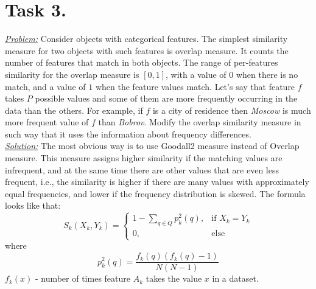 \documentclass[a4paper,12pt]{article} %
\begin{document}
\section*{Task 3.}
\underline{\textit{Problem:}} Consider objects with categorical features. The simplest similarity measure for two objects with such
features is overlap measure. It counts the number of features that match in both objects. The range of per-features similarity for the overlap measure is $[0, 1]$, with a value of $0$ when there is no match, and
a value of $1$ when the feature values match. Let’s say that feature $f$ takes $P$ possible values and some of them are more frequently occurring in the data than the others. For example, if $f$ is a city of residence then \textit{Moscow} is much more frequent value of $f$ than \textit{Bobrov}. Modify the overlap similarity measure in such way that it uses the information about frequency differences.\\
\newline
\underline{\textit{Solution:}} The most obvious way is to use Goodall2 measure instead of Overlap measure. This measure assigns higher similarity if the matching values are infrequent, and at the same time there are other values that are even less frequent, i.e., the similarity is higher if there are many values with approximately equal frequencies, and lower if the frequency distribution is skewed. The formula looks like that:
\[
S_k(X_k, Y_k) = 
\begin{cases} 
1 - \sum\limits_{q \in Q}p_k^2(q), &\mbox{if } X_k = Y_k \\
0, & \mbox{else}
\end{cases} 
\]
where 
\[
	p_k^2(q) = \frac{f_k(q)(f_k(q) - 1)}{N(N - 1)}
\]
$f_k(x)$ - number of times feature $A_k$ takes the value $x$ in a dataset.
\end{document}
